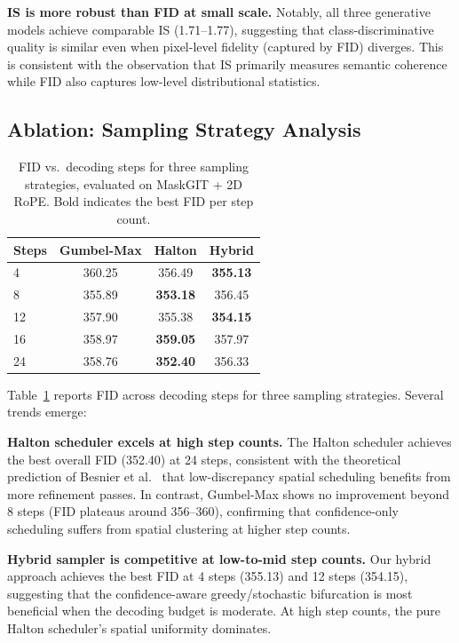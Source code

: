 \documentclass[conference]{IEEEtran}
\begin{document}
\textbf{IS is more robust than FID at small scale.} Notably, all three generative models achieve comparable IS (1.71--1.77), suggesting that class-discriminative quality is similar even when pixel-level fidelity (captured by FID) diverges. This is consistent with the observation that IS primarily measures semantic coherence while FID also captures low-level distributional statistics.


\subsection{Ablation: Sampling Strategy Analysis}

\begin{table}[!t]
\centering
\caption{FID vs.\ decoding steps for three sampling strategies, evaluated on MaskGIT + 2D RoPE. Bold indicates the best FID per step count.}
\label{tab:ablation_steps}
\begin{tabular}{lccc}
\toprule
\textbf{Steps} & \textbf{Gumbel-Max} & \textbf{Halton} & \textbf{Hybrid} \\
\midrule
4  & 360.25 & 356.49 & \textbf{355.13} \\
8  & 355.89 & \textbf{353.18} & 356.45 \\
12 & 357.90 & 355.38 & \textbf{354.15} \\
16 & 358.97 & \textbf{359.05} & 357.97 \\
24 & 358.76 & \textbf{352.40} & 356.33 \\
\bottomrule
\end{tabular}
\end{table}

Table~\ref{tab:ablation_steps} reports FID across decoding steps for three sampling strategies. Several trends emerge:

\textbf{Halton scheduler excels at high step counts.} The Halton scheduler achieves the best overall FID (352.40) at 24 steps, consistent with the theoretical prediction of Besnier et al.~\cite{besnier2025halton} that low-discrepancy spatial scheduling benefits from more refinement passes. In contrast, Gumbel-Max shows no improvement beyond 8 steps (FID plateaus around 356--360), confirming that confidence-only scheduling suffers from spatial clustering at higher step counts.

\textbf{Hybrid sampler is competitive at low-to-mid step counts.} Our hybrid approach achieves the best FID at 4 steps (355.13) and 12 steps (354.15), suggesting that the confidence-aware greedy/stochastic bifurcation is most beneficial when the decoding budget is moderate. At high step counts, the pure Halton scheduler's spatial uniformity dominates.
\end{document}
